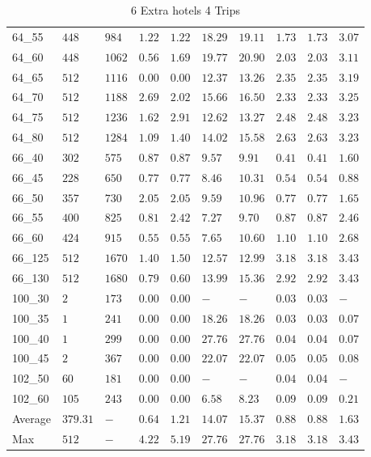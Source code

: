 \begin{center}
\begin{table}[]
\begin{tabular}{|lll|l|l|ll|lll|}
64\_55  & $448   $& $984 $ & $1.22$ & $1.22$   & $18.29$  & $19.11$ & $1.73$ & $1.73$ & $3.07$ \\
64\_60  & $448   $& $1062$ & $0.56$ & $1.69$   & $19.77$  & $20.90$ & $2.03$ & $2.03$ & $3.11$ \\
64\_65  & $512   $& $1116$ & $\bm{0.00}$ & $\bm{0.00}$   & $12.37$  & $13.26$ & $2.35$ & $2.35$ & $3.19$ \\
64\_70  & $512   $& $1188$ & $2.69$ & $2.02$   & $15.66$  & $16.50$ & $2.33$ & $2.33$ & $3.25$ \\
64\_75  & $512   $& $1236$ & $1.62$ & $2.91$   & $12.62$  & $13.27$ & $2.48$ & $2.48$ & $3.23$ \\
64\_80  & $512   $& $1284$ & $1.09$ & $1.40$   & $14.02$  & $15.58$ & $2.63$ & $2.63$ & $3.23$ \\
\hline
66\_40  & $302   $& $575 $ & $0.87$ & $0.87$   & $9.57 $  & $9.91$  & $0.41$ & $0.41$ & $1.60$ \\
66\_45  & $228   $& $650 $ & $0.77$ & $0.77$   & $8.46 $  & $10.31$ & $0.54$ & $0.54$ & $0.88$ \\
66\_50  & $357   $& $730 $ & $2.05$ & $2.05$   & $9.59 $  & $10.96$ & $0.77$ & $0.77$ & $1.65$ \\
66\_55  & $400   $& $825 $ & $0.81$ & $2.42$   & $7.27 $  & $9.70$  & $0.87$ & $0.87$ & $2.46$ \\
66\_60  & $424   $& $915 $ & $0.55$ & $0.55$   & $7.65 $  & $10.60$ & $1.10$ & $1.10$ & $2.68$ \\
66\_125 & $512   $& $1670$ & $1.40$ & $1.50$   & $12.57$  & $12.99$ & $3.18$ & $3.18$ & $3.43$ \\
66\_130 & $512   $& $1680$ & $0.79$ & $0.60$   & $13.99$  & $15.36$ & $2.92$ & $2.92$ & $3.43$ \\
\hline
100\_30 & $2     $& $173 $ & $\bm{0.00}$ & $\bm{0.00}$   & $-    $  & $-$     & $0.03$ & $0.03$ & $-   $ \\
100\_35 & $1     $& $241 $ & $\bm{0.00}$ & $\bm{0.00}$   & $18.26$  & $18.26$ & $0.03$ & $0.03$ & $0.07$ \\
100\_40 & $1     $& $299 $ & $\bm{0.00}$ & $\bm{0.00}$   & $27.76$  & $27.76$ & $0.04$ & $0.04$ & $0.07$ \\
100\_45 & $2     $& $367 $ & $\bm{0.00}$ & $\bm{0.00}$   & $22.07$  & $22.07$ & $0.05$ & $0.05$ & $0.08$ \\
\hline
102\_50 & $60    $& $181 $ & $\bm{0.00}$ & $\bm{0.00}$   & $-    $  & $-$     & $0.04$ & $0.04$ & $-   $ \\
102\_60 & $105   $& $243 $ & $\bm{0.00}$ & $\bm{0.00}$   & $6.58 $  & $8.23$  & $0.09$ & $0.09$ & $0.21$ \\
\hline
Average & $379.31$& $-   $ & $0.64$ & $1.21$   & $14.07$  & $15.37$ & $0.88$ & $0.88$ & $1.63$ \\
Max     & $512   $& $-   $ & $4.22$ & $5.19$   & $27.76$  & $27.76$ & $3.18$ & $3.18$ & $3.43$ \\
\hline
\end{tabular}
\caption{6 Extra hotels 4 Trips}
\label{6-4}
\end{table}
\end{center}
